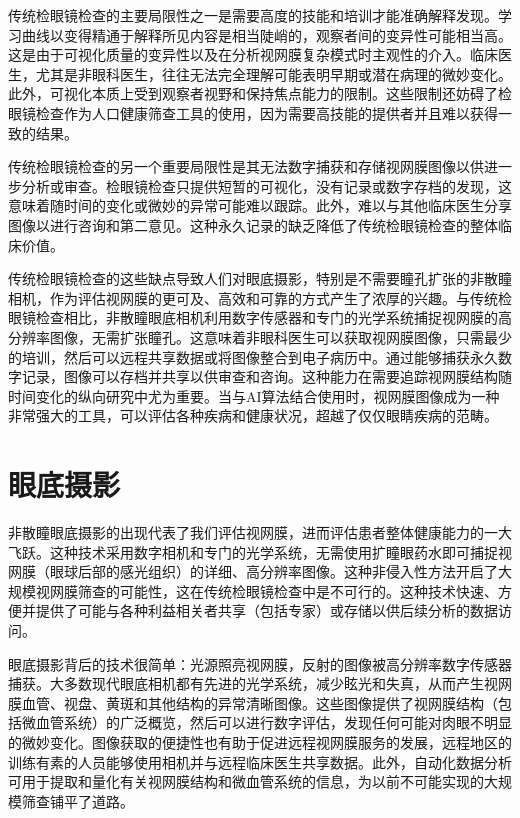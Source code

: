 \documentclass[
  Letterpaper,
]{scrbook}
\begin{document}
传统检眼镜检查的主要局限性之一是需要高度的技能和培训才能准确解释发现。学习曲线以变得精通于解释所见内容是相当陡峭的，观察者间的变异性可能相当高。这是由于可视化质量的变异性以及在分析视网膜复杂模式时主观性的介入。临床医生，尤其是非眼科医生，往往无法完全理解可能表明早期或潜在病理的微妙变化。此外，可视化本质上受到观察者视野和保持焦点能力的限制。这些限制还妨碍了检眼镜检查作为人口健康筛查工具的使用，因为需要高技能的提供者并且难以获得一致的结果。

传统检眼镜检查的另一个重要局限性是其无法数字捕获和存储视网膜图像以供进一步分析或审查。检眼镜检查只提供短暂的可视化，没有记录或数字存档的发现，这意味着随时间的变化或微妙的异常可能难以跟踪。此外，难以与其他临床医生分享图像以进行咨询和第二意见。这种永久记录的缺乏降低了传统检眼镜检查的整体临床价值。

传统检眼镜检查的这些缺点导致人们对眼底摄影，特别是不需要瞳孔扩张的非散瞳相机，作为评估视网膜的更可及、高效和可靠的方式产生了浓厚的兴趣。与传统检眼镜检查相比，非散瞳眼底相机利用数字传感器和专门的光学系统捕捉视网膜的高分辨率图像，无需扩张瞳孔。这意味着非眼科医生可以获取视网膜图像，只需最少的培训，然后可以远程共享数据或将图像整合到电子病历中。通过能够捕获永久数字记录，图像可以存档并共享以供审查和咨询。这种能力在需要追踪视网膜结构随时间变化的纵向研究中尤为重要。当与AI算法结合使用时，视网膜图像成为一种非常强大的工具，可以评估各种疾病和健康状况，超越了仅仅眼睛疾病的范畴。

\section{眼底摄影}\label{ux773cux5e95ux6444ux5f71}

非散瞳眼底摄影的出现代表了我们评估视网膜，进而评估患者整体健康能力的一大飞跃。这种技术采用数字相机和专门的光学系统，无需使用扩瞳眼药水即可捕捉视网膜（眼球后部的感光组织）的详细、高分辨率图像。这种非侵入性方法开启了大规模视网膜筛查的可能性，这在传统检眼镜检查中是不可行的。这种技术快速、方便并提供了可能与各种利益相关者共享（包括专家）或存储以供后续分析的数据访问。

眼底摄影背后的技术很简单：光源照亮视网膜，反射的图像被高分辨率数字传感器捕获。大多数现代眼底相机都有先进的光学系统，减少眩光和失真，从而产生视网膜血管、视盘、黄斑和其他结构的异常清晰图像。这些图像提供了视网膜结构（包括微血管系统）的广泛概览，然后可以进行数字评估，发现任何可能对肉眼不明显的微妙变化。图像获取的便捷性也有助于促进远程视网膜服务的发展，远程地区的训练有素的人员能够使用相机并与远程临床医生共享数据。此外，自动化数据分析可用于提取和量化有关视网膜结构和微血管系统的信息，为以前不可能实现的大规模筛查铺平了道路。
\end{document}
